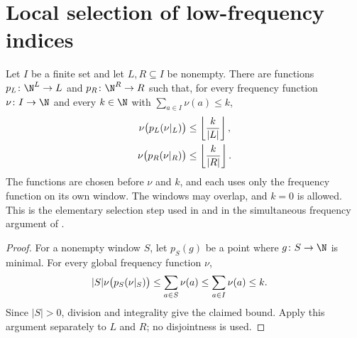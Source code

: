 \section{Local selection of low-frequency indices}

\begin{theorem}
    \label{thm:two_window_low_frequency_selectors}
    \leanok
    Let $I$ be a finite set and let $L,R\subseteq I$ be nonempty.
    There are functions
    $p_L\colon\N^L\to L$ and $p_R\colon\N^R\to R$ such that, for every
    frequency function $\nu\colon I\to\N$ and every $k\in\N$ with
    $\sum_{a\in I}\nu(a)\le k$,
    \begin{align}
        \nu\bigl(p_L(\nu|_L)\bigr)&\le\left\lfloor\frac{k}{|L|}\right\rfloor,
        \notag\\
        \nu\bigl(p_R(\nu|_R)\bigr)&\le\left\lfloor\frac{k}{|R|}\right\rfloor.
        \notag
    \end{align}
    The functions are chosen before $\nu$ and $k$, and each uses only the
    frequency function on its own window. The windows may overlap, and
    $k=0$ is allowed. This is the elementary selection step used in
    \cite[Lemma~4.2]{Arad2013AreaLaw} and in the simultaneous frequency
    argument of \cite[Proposition~5.7]{Arad2016RigorousRG}.
\end{theorem}
\begin{proof}
    \leanok
    For a nonempty window $S$, let $p_S(g)$ be a point where
    $g\colon S\to\N$ is minimal. For every global frequency function $\nu$,
    \begin{align}
        |S|\nu\bigl(p_S(\nu|_S)\bigr)
            &\le\sum_{a\in S}\nu(a)
            \le\sum_{a\in I}\nu(a)\le k.\notag
    \end{align}
    Since $|S|>0$, division and integrality give the claimed bound.
    Apply this argument separately to $L$ and $R$; no disjointness is used.
\end{proof}
